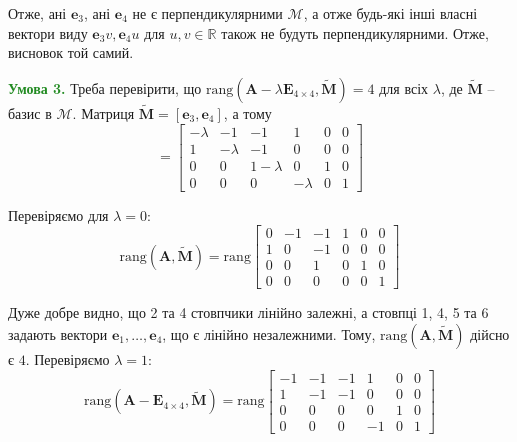 \documentclass[oneside,solution]{karazin-control-assign}
\begin{document}
Отже, ані $\mathbf{e}_3$, ані $\mathbf{e}_4$ не є перпендикулярними $\mathcal{M}$, а отже будь-які інші власні вектори виду $\mathbf{e}_3v, \mathbf{e}_4u$ для $u,v \in \mathbb{R}$ також не будуть перпендикулярними. Отже, висновок той самий.

\textcolor{ForestGreen}{\textbf{Умова 3.}} Треба перевірити, що $\text{rang}(\boldsymbol{A}-\lambda\boldsymbol{E}_{4 \times 4}, \widetilde{\boldsymbol{M}}) = 4$ для всіх $\lambda$, де $\widetilde{\boldsymbol{M}}$ -- базис в $\mathcal{M}$. Матриця $\widetilde{\boldsymbol{M}} = [\mathbf{e}_3,\mathbf{e}_4]$, а тому
\begin{equation}
    [\boldsymbol{A} - \lambda \boldsymbol{E}_{4 \times 4}, \widetilde{\boldsymbol{M}}] = \begin{bmatrix}
        -\lambda & -1 & -1 & 1 & 0 & 0 \\
        1 & -\lambda & -1 & 0 & 0 & 0 \\
        0 & 0 & 1-\lambda & 0 & 1 & 0\\
        0 & 0 & 0 & -\lambda & 0 & 1
    \end{bmatrix}
\end{equation}

Перевіряємо для $\lambda = 0$:
\begin{equation}
    \text{rang}(\boldsymbol{A},\widetilde{\boldsymbol{M}}) = \text{rang}\begin{bmatrix}
        0 & -1 & -1 & 1 & 0 & 0 \\
        1 & 0 & -1 & 0 & 0 & 0 \\
        0 & 0 & 1 & 0 & 1 & 0 \\
        0 & 0 & 0 & 0 & 0 & 1
    \end{bmatrix}
\end{equation}

Дуже добре видно, що 2 та 4 стовпчики лінійно залежні, а стовпці 1, 4, 5 та 6 задають вектори $\mathbf{e}_1,\dots,\mathbf{e}_4$, що є лінійно незалежними. Тому, $\text{rang}(\boldsymbol{A},\widetilde{\boldsymbol{M}})$ дійсно є $4$. Перевіряємо $\lambda=1$:
\begin{equation}
    \text{rang}(\boldsymbol{A}-\boldsymbol{E}_{4 \times 4},\widetilde{\boldsymbol{M}}) = \text{rang}\begin{bmatrix}
        -1 & -1 & -1 & 1 & 0 & 0 \\
        1 & -1 & -1 & 0 & 0 & 0 \\
        0 & 0 & 0 & 0 & 1 & 0 \\
        0 & 0 & 0 & -1 & 0 & 1
    \end{bmatrix}
\end{equation}
\end{document}
